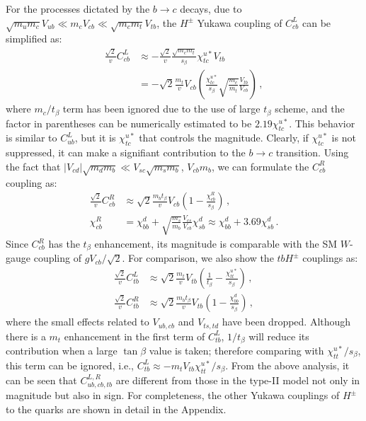 \documentclass[prd,preprint,superscriptaddress,amsmath,amssymb]{revtex4}
\begin{document}
 For the processes dictated by the $b\to c$ decays,  due to  $\sqrt{m_u m_c} V_{ub} \ll m_c V_{cb} \ll \sqrt{m_c m_t} V_{tb}$,  the $H^\pm$ Yukawa coupling of $C^L_{cb}$ can be simplified as:
%
   \begin{align}
   \frac{\sqrt{2}}{v}  C^L_{cb} & \approx - \frac{\sqrt{2}}{v} \frac{\sqrt{m_c m_t}}{s_\beta} \chi^{u*}_{tc} V_{tb}  \nonumber \\
    & = - \sqrt{2} \frac{m_t}{v} V_{cb}  \left(  \frac{\chi^{u*}_{tc}}{s_\beta} \sqrt{\frac{m_c}{m_t}} \frac{V_{tb}}{V_{cb}}\right)\,,\label{eq:CLcb}
    \end{align} 
    where $m_c/t_\beta$ term has been ignored due to the use of large $t_\beta$ scheme, and the factor in parentheses can be numerically estimated to be $2.19 \chi^{u*}_{tc}$. This behavior is similar to $C^L_{ub}$, but it is $\chi^{u*}_{tc}$ that controls the magnitude. Clearly, if $\chi^{u*}_{tc}$ is not suppressed, it can make a signifiant contribution to the $b\to c$ transition. Using the fact that  $|V_{cd}| \sqrt{m_d m_b}\ll  V_{sc} \sqrt{m_s m_b}$, $V_{cb} m_b$, we can formulate the $C^R_{cb}$ coupling as:
   \begin{align}
   \frac{\sqrt{2}}{v} C^R_{cb} &  \approx  \sqrt{2} \frac{m_b t_\beta}{v}  V_{cb} \left(1 - \frac{\chi^R_{cb}}{s_\beta} \right) \,, \label{eq:CRcb} \\
 \chi^R_{cb} &= \chi^d_{bb} + \sqrt{\frac{m_s}{m_b}} \frac{V_{cs}}{V_{cb}}  \chi^d_{sb} \approx   \chi^d_{bb} + 3.69 \chi^d_{sb}\,. \nonumber 
   \end{align}
Since $C^R_{cb}$ has the $t_\beta$ enhancement, its magnitude is comparable with the SM $W$-gauge coupling of $g V_{cb}/\sqrt{2}$. 
For comparison, we also show the $tbH^\pm$ couplings as:
 \begin{align}
 \frac{\sqrt{2}}{v}C^L_{tb} & \approx \sqrt{2} \frac{m_t}{v} V_{tb} \left( \frac{1}{t_\beta}  - \frac{\chi^{u*}_{tt}}{s_\beta}\right)\,, \\
 \frac{\sqrt{2}}{v}C^R_{tb} & \approx \sqrt{2} \frac{m_b t_\beta}{v} V_{tb} \left( 1 - \frac{\chi^d_{bb}}{s_\beta}\right)\,,
 \end{align}
 where the small effects related to $V_{ub,cb}$ and $V_{ts,td}$ have been dropped.  Although there is a $m_t$ enhancement in the first term of $C^L_{tb}$, $1/t_\beta$ will reduce its contribution when a large $\tan\beta$ value is taken; therefore comparing with $\chi^{u*}_{tt}/s_\beta$, this term  can be ignored, i.e., $C^L_{tb} \approx - m_t V_{tb} \chi^{u*}_{tt} / s_\beta$. From the above analysis, it can be seen that $C^{L,R}_{ub,cb,tb}$  are different from those in the type-II model not only in magnitude but also in sign. For completeness,  the other Yukawa couplings of $H^\pm$ to the quarks are shown in detail  in the Appendix. 
\end{document}
